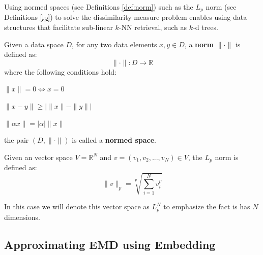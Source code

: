 \iftoggle{edit-mode}{\hspace{0pt}\marginpar{$L_p$ advantage and drawbacks}}{}
Using normed spaces (see Definitions \ref{def:norm}) such as the $L_p$ norm (see Definitions \ref{lp}) to solve the dissimilarity measure problem enables using data structures that facilitate sub-linear $k$-NN retrieval, such as $k$-d trees.

\begin{definition}
Given a data space $D$, for any two data elements  $x,y \in D$, a \textbf{norm} $\|\cdot\|$ is defined as:
\begin{equation}
\|\cdot\|: D \longrightarrow \mathbb{R}
\end{equation}
where the following conditions hold:
\begin{compactitem}
\item $\|x\|=0 \Leftrightarrow x=0$
\item $\|x-y\| \geq|\|x\|-\|y\||$
\item $\|\alpha x\|=|\alpha|\|x\|$
\end{compactitem}
the pair $\left(D,\|\cdot\|\right)$ is called a \textbf{normed space}.
\label{def:norm}
\end{definition}


\begin{definition}
Given an vector space $V=\mathbb{R}^N$ and $v=(v_1,v_2,...,v_N) \in V$, the $L_p$ norm is defined as:
\begin{equation}
\|v\|_p=\sqrt[p]{\sum\limits_{i=1}^N v_i^p}
\end{equation}
\label{lp}
\end{definition}
In this case we will denote this vector space as $L_p^N$ to emphasize the fact is has $N$ dimensions.

\subsection{Approximating EMD using Embedding}
\label{subsec:approximating_emd_using_embedding}


